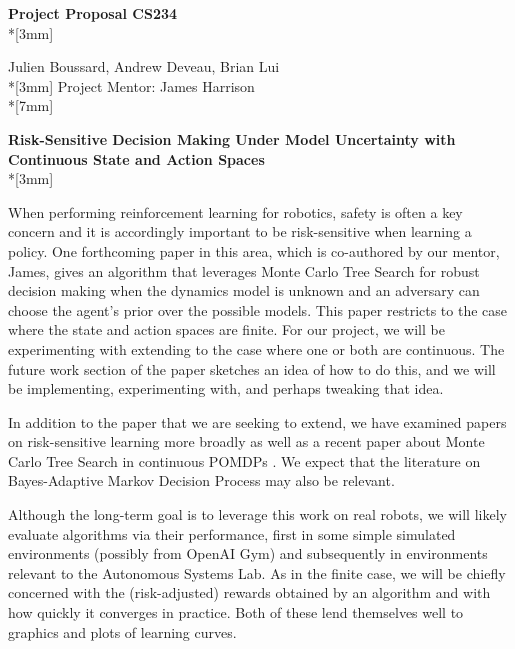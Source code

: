 \documentclass{article}
\begin{document}
\begin{center}
{\Large{\bf Project Proposal CS234}}\\*[3mm]

Julien Boussard, Andrew Deveau, Brian Lui   \\*[3mm]
{Project Mentor:} James Harrison \\*[7mm]

{\Large{\bf Risk-Sensitive Decision Making Under Model Uncertainty with Continuous State and Action Spaces}} \\*[3mm]

\end{center}

\addvspace{0.3in}


When performing reinforcement learning for robotics, safety is often a key concern and it is accordingly important to be risk-sensitive when learning a policy. One forthcoming paper in this area, which is co-authored by our mentor, James, gives an algorithm that leverages Monte Carlo Tree Search for robust decision making when the dynamics model is unknown and an adversary can choose the agent's prior over the possible models. This paper restricts to the case where the state and action spaces are finite. For our project, we will be experimenting with extending to the case where one or both are continuous. The future work section of the paper sketches an idea of how to do this, and we will be implementing, experimenting with, and perhaps tweaking that idea.\newline

In addition to the paper that we are seeking to extend, we have examined papers on risk-sensitive learning more broadly \cite{DBLP:journals/corr/abs-1711-10055} \cite{DBLP:journals/corr/abs-1710-11040} as well as a recent paper about Monte Carlo Tree Search in continuous POMDPs \cite{DBLP:journals/corr/abs-1709-06196}. We expect that the literature on Bayes-Adaptive Markov Decision Process may also be relevant.\newline

Although the long-term goal is to leverage this work on real robots, we will likely evaluate algorithms via their performance, first in some simple simulated environments (possibly from OpenAI Gym) and subsequently in environments relevant to the Autonomous Systems Lab. As in the finite case, we will be chiefly concerned with the (risk-adjusted) rewards obtained by an algorithm and with how quickly it converges in practice. Both of these lend themselves well to graphics and plots of learning curves. 




\end{document}
